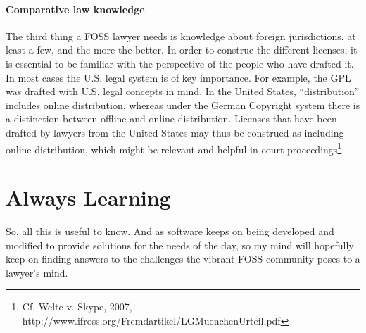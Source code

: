\paragraph*{Comparative law knowledge}
The third thing a FOSS lawyer needs is knowledge about foreign jurisdictions, at
least a few, and the more the better. In order to construe the different
licenses, it is essential to be familiar with the perspective of the people who
have drafted it. In most cases the U.S. legal system is of key importance. For
example, the GPL was drafted with U.S. legal concepts in mind. In the United
States, ``distribution'' includes online distribution, whereas under the German
Copyright system there is a distinction between offline and online distribution.
Licenses that have been drafted by lawyers from the United States may thus be
construed as including online distribution, which might be relevant and helpful
in court proceedings\footnote{Cf. Welte v. Skype, 2007, 
http://www.ifross.org/Fremdartikel/LGMuenchenUrteil.pdf}.
 
\section*{Always Learning}
So, all this is useful to know. And as software keeps on being developed and
modified to provide solutions for the needs of the day, so my mind will
hopefully keep on finding answers to the challenges the vibrant FOSS community
poses to a lawyer's mind.

